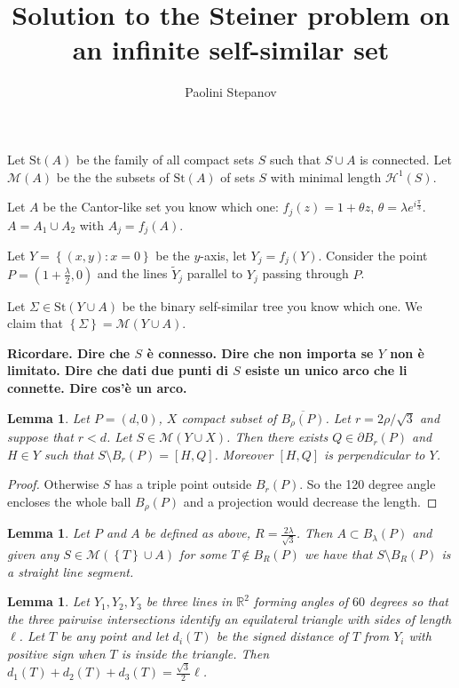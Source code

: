 \documentclass{article}
\title{Solution to the Steiner problem on an infinite self-similar set}
\author{Paolini Stepanov}
\newcommand{\RR}{\mathbb R}
\renewcommand{\H}{\mathcal H}
\newcommand{\ENCLOSE}[1]{\left\{#1\right\}}
\newcommand{\St}{\mathrm{St}}
\newcommand{\M}{\mathcal{M}}
\renewcommand{\H}{\mathcal{H}}
\newtheorem{lemma}[theorem]{Lemma}
\theoremstyle{definition}
\theoremstyle{remark}
\begin{document}
\maketitle
Let $\St(A)$ be the family of all compact sets $S$ such that 
$S\cup A$ is connected.
Let $\M(A)$ be the the subsets of $\St(A)$ of sets $S$ 
with minimal length $\H^1(S)$.

Let $A$ be the Cantor-like set you know which one: 
$f_j(z) = 1 + \theta z$,
$\theta = \lambda e^{i \frac \pi 3}$.
$A=A_1\cup A_2$ 
with $A_j = f_j(A)$.

Let $Y=\ENCLOSE{(x,y)\colon x=0}$ be the $y$-axis,
let $Y_j = f_j(Y)$.
Consider the point $P=(1+\frac\lambda 2,0)$ 
and the lines $\tilde Y_j$ parallel to $Y_j$ 
passing through $P$.

Let $\Sigma\in \St(Y\cup A)$ be the binary self-similar 
tree you know which one.
We claim that $\ENCLOSE{\Sigma} = \M(Y\cup A)$.

\textbf{Ricordare. Dire che $S$ è connesso. 
Dire che non importa se $Y$ non è limitato.
Dire che dati due punti di $S$ esiste un unico arco che li connette.
Dire cos'è un arco. }

\begin{lemma}\label{lm:base}
  Let $P=(d,0)$, $X$ compact subset of $\overline{B_\rho(P)}$.
  Let $r=2\rho/\sqrt 3$ and suppose that $r<d$.
  Let $S \in \M(Y\cup X)$.
  Then there exists $Q\in \partial B_r(P)$ and $H\in Y$
  such that $S\setminus B_r(P) = [H,Q]$.
  Moreover $[H,Q]$ is perpendicular to $Y$.
\end{lemma}
\begin{proof}
    Otherwise $S$ has a triple point outside $B_r(P)$.
    So the 120 degree angle encloses the whole ball $B_\rho(P)$ 
    and a projection would decrease the length.
\end{proof}
  
\begin{lemma}\label{lm:01}
  Let $P$ and $A$ be defined as above,
  $R=\frac{2\lambda}{\sqrt 3}$.
  Then $A\subset B_\lambda(P)$ and 
  given any $S\in \M(\ENCLOSE{T}\cup A)$ 
  for some $T\not \in B_R(P)$
  we have that $S\setminus B_R(P)$ is a straight line segment.
\end{lemma}

\begin{lemma}\label{lm:tripod}
  Let $Y_1,Y_2,Y_3$ be three lines in $\RR^2$
  forming angles of $60$ degrees so that 
  the three pairwise intersections identify
  an equilateral triangle with sides of length $\ell$.
  Let $T$ be any point and let $d_i(T)$ be 
  the signed distance of $T$ from $Y_i$
  with positive sign when $T$ is inside the triangle.
  Then $d_1(T) + d_2(T) + d_3(T) = \frac{\sqrt 3}{2}\ell$.
\end{lemma}
\end{document}
